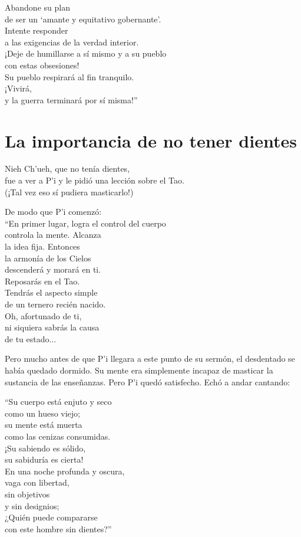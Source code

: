 \documentclass[book,b5paper,hidelinks,final]{memoir}
\begin{document}
	Abandone su plan\\
	de ser un `amante y equitativo gobernante'.\\
	Intente responder\\
	a las exigencias de la verdad interior.\\
	¡Deje de humillarse a sí mismo y a su pueblo\\
	con estas obsesiones!\\
	Su pueblo respirará al fin tranquilo.\\
	¡Vivirá,\\
	y la guerra terminará por sí misma!''
	
	\chapter*{La importancia de no tener dientes}
	
	Nieh Ch'ueh, que no tenía dientes,\\
	fue a ver a P'i y le pidió una lección sobre el Tao.\\
	(¡Tal vez eso sí pudiera masticarlo!)
	
	De modo que P'i comenzó:\\
	``En primer lugar, logra el control del cuerpo\\
	controla la mente. Alcanza\\
	la idea fija. Entonces\\
	la armonía de los Cielos\\
	descenderá y morará en ti.\\
	Reposarás en el Tao.\\
	Tendrás el aspecto simple\\
	de un ternero recién nacido.\\
	Oh, afortunado de ti,\\
	ni siquiera sabrás la causa\\
	de tu estado...
	
	Pero mucho antes de que P'i llegara a este punto de su sermón, el
	desdentado se había quedado dormido. Su mente era simplemente incapaz de
	masticar la sustancia de las enseñanzas. Pero P'i quedó satisfecho. Echó
	a andar cantando:
	
	``Su cuerpo está enjuto y seco\\
	como un hueso viejo;\\
	su mente está muerta\\
	como las cenizas consumidas.\\
	¡Su sabiendo es sólido,\\
	su sabiduría es cierta!\\
	En una noche profunda y oscura,\\
	vaga con libertad,\\
	sin objetivos\\
	y sin designios;\\
	¿Quién puede compararse\\
	con este hombre sin dientes?''
	
\end{document}

